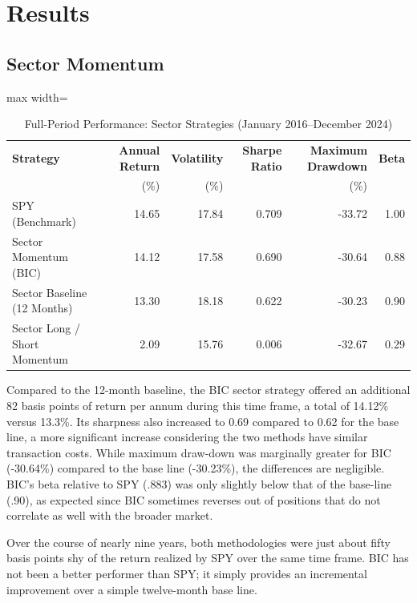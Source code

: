 \documentclass[12pt]{article}
\begin{document}
\section{Results}

\subsection{Sector Momentum}

\begin{table}[H]
\centering
\caption{Full-Period Performance: Sector Strategies (January 2016--December 2024)}
\label{tab:sector_perf}
\begingroup
\singlespacing
\footnotesize
\setlength{\tabcolsep}{4pt}
\renewcommand{\arraystretch}{1.12}
\begin{adjustbox}{max width=\textwidth}
\begin{tabular}{lrrrrr}
\hline
\textbf{Strategy} &
\textbf{Annual Return} &
\textbf{Volatility} &
\textbf{Sharpe Ratio} &
\textbf{Maximum Drawdown} &
\textbf{Beta} \\
& (\%) & (\%) & & (\%) & \\
\hline
SPY (Benchmark) & 14.65 & 17.84 & 0.709 & -33.72 & 1.00 \\
Sector Momentum (BIC) & 14.12 & 17.58 & 0.690 & -30.64 & 0.88 \\
Sector Baseline (12 Months) & 13.30 & 18.18 & 0.622 & -30.23 & 0.90 \\
Sector Long / Short Momentum & 2.09 & 15.76 & 0.006 & -32.67 & 0.29 \\
\hline
\end{tabular}
\end{adjustbox}
\endgroup
\end{table}

Compared to the 12-month baseline, the BIC sector strategy offered an additional 82 basis points of return per annum during this time frame, a total of 14.12\% versus 13.3\%. Its sharpness also increased to 0.69 compared to 0.62 for the base line, a more significant increase considering the two methods have similar transaction costs. While maximum draw-down was marginally greater for BIC (-30.64\%) compared to the base line (-30.23\%), the differences are negligible. BIC's beta relative to SPY (.883) was only slightly below that of the base-line (.90), as expected since BIC sometimes reverses out of positions that do not correlate as well with the broader market.

Over the course of nearly nine years, both methodologies were just about fifty basis points shy of the return realized by SPY over the same time frame. BIC has not been a better performer than SPY; it simply provides an incremental improvement over a simple twelve-month base line.
\end{document}
